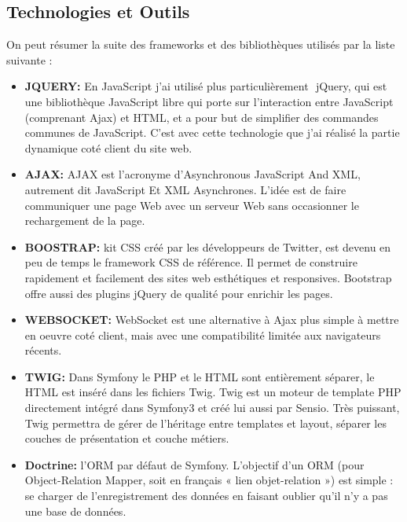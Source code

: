 \documentclass[12pt]{article}
\begin{document}
\subsection{Technologies et Outils}

On peut résumer la suite  des frameworks et des  bibliothèques utilisés  par la liste suivante :
\begin{itemize}

\item \textbf{JQUERY:} En JavaScript j’ai utilisé plus particulièrement ​
jQuery, qui est une bibliothèque
JavaScript libre qui porte sur l'interaction entre JavaScript
(comprenant Ajax) et HTML, et a pour but de simplifier des
commandes communes de JavaScript. C’est avec cette technologie que j’ai réalisé la partie dynamique coté client du site web.

\item \textbf{AJAX:} AJAX est l'acronyme d'Asynchronous JavaScript And XML, autrement dit JavaScript Et XML Asynchrones.
L'idée  est de faire communiquer une page Web avec un serveur Web sans occasionner le rechargement de la page. 

\item \textbf{BOOSTRAP:} kit CSS créé par les développeurs de Twitter, est devenu en peu de temps le framework CSS de référence. Il permet de  construire rapidement et facilement des sites web esthétiques et responsives. Bootstrap offre aussi des plugins jQuery de qualité pour enrichir les pages.

\item \textbf{WEBSOCKET:} WebSocket est une alternative à Ajax plus simple à mettre en oeuvre coté client, mais avec une compatibilité limitée aux navigateurs récents.

\item \textbf{TWIG:} Dans Symfony le PHP et le HTML sont entièrement séparer, le HTML est inséré
dans les fichiers Twig. Twig est un moteur de template PHP
directement intégré dans Symfony3 et créé lui aussi par Sensio. Très
puissant, Twig permettra de gérer de l’héritage entre templates et
layout, séparer les couches de présentation et couche métiers.

\item \textbf{Doctrine: } l'ORM par défaut de Symfony. L'objectif d'un ORM (pour Object-Relation Mapper, soit en français « lien objet-relation ») est simple : se charger de l'enregistrement des données en  faisant oublier qu'il n'y a pas  une base de données.

\end{itemize}
\\ 
\\
\end{document}
